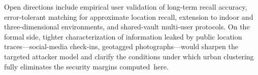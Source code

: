 \documentclass[mathematics,article,accept,pdftex,moreauthors]{Definitions/mdpi}
\begin{document}
{Open directions include empirical user validation of long-term recall accuracy, error-tolerant matching for approximate location recall, extension to indoor and three-dimensional environments, and shared-vault multi-user protocols. On the formal side, tighter characterization of information leaked by public location traces---social-media check-ins, geotagged photographs---would sharpen the targeted attacker model and clarify the conditions under which urban clustering fully eliminates the security margins \mbox{computed here.}}
\end{document}
